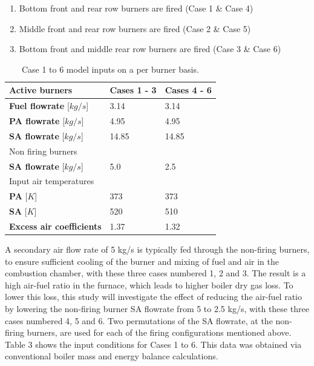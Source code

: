 \documentclass[twocolumn,10pt]{asme2ej}
\begin{document}
\begin{enumerate}
\item Bottom front and rear row burners are fired (Case 1 \& Case 4)
\item Middle front and rear row burners are fired (Case 2 \& Case 5)
\item Bottom front and middle rear row burners are fired (Case 3 \& Case 6)
\end{enumerate}
\begin{table}[h!]
\centering
\caption{Case 1 to 6 model inputs on a per burner basis.}
\label{tbl_case_inputs}
\vspace{2mm}
{\tabulinesep=1.2mm
\begin{tabularx}{3.25in}{p{1.4in} p{0.75in} l}
\hline
Active burners & \textbf{Cases 1 - 3} & \textbf{Cases 4 - 6}\\
\hline
\textbf{Fuel flowrate} [$kg/s$]&3.14  &3.14\\
\textbf{PA flowrate} [$kg/s$]&4.95  &4.95\\
\textbf{SA flowrate} [$kg/s$]&14.85  &14.85\\
\hline
Non firing burners &  & \\
\hline
\textbf{SA flowrate} [$kg/s$]&5.0  &2.5\\
\hline
Input air temperatures& &\\
\hline
\textbf{PA} [$K$]&373  &373\\
\textbf{SA} [$K$]&520  &510\\
\hline
\textbf{Excess air coefficients} & 1.37 & 1.32\\
\hline
\end{tabularx}}

\end{table}

A secondary air flow rate of 5 kg/s is typically fed through the non-firing burners, to ensure sufficient cooling of the burner and mixing of fuel and air in the combustion chamber, with these three cases numbered 1, 2 and 3. The result is a high air-fuel ratio in the furnace, which leads to higher boiler dry gas loss. To lower this loss, this study will investigate the effect of reducing the air-fuel ratio by lowering the non-firing burner SA flowrate from 5 to 2.5 kg/s, with these three cases numbered 4, 5 and 6. Two permutations of the SA flowrate, at the non-firing burners, are used for each of the firing configurations mentioned above. Table 3 shows the input conditions for Cases 1 to 6. This data was obtained via conventional boiler mass and energy balance calculations.
\end{document}
